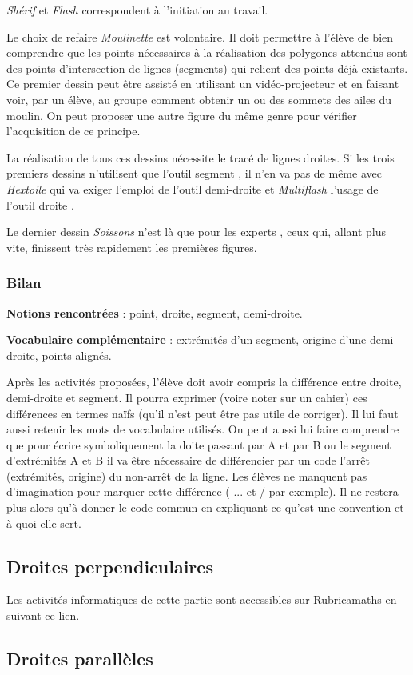 \textit{Shérif} et \textit{Flash} correspondent à l’initiation au travail.

Le choix de refaire \textit{Moulinette} est volontaire. Il doit permettre à l’élève de bien comprendre que les points nécessaires à la réalisation des polygones attendus sont des points d’intersection de lignes (segments) qui relient des points déjà existants. Ce premier dessin peut être \og assisté \fg{} en utilisant un vidéo-projecteur et en faisant voir, par un élève, au groupe comment obtenir un ou des sommets des ailes du moulin. On peut proposer une autre figure du même genre pour vérifier l’acquisition de ce principe.

La réalisation de tous ces dessins nécessite le tracé de lignes droites. Si les trois premiers dessins n’utilisent que l’outil \og segment \fg{}, il n’en va pas de même avec \textit{Hextoile} qui va exiger l’emploi de l’outil \og demi-droite \fg{} et \textit{Multiflash} l’usage de l’outil \og droite \fg{}.

Le dernier dessin \textit{Soissons} n’est là que pour les \og experts \fg{}, ceux qui, allant plus vite, finissent très rapidement les premières figures.

\subsubsection{Bilan}

\textbf{Notions rencontrées} : point, droite, segment, demi-droite.

\textbf{Vocabulaire complémentaire} : extrémités d’un segment, origine d’une demi-droite, points alignés.

Après les activités proposées, l’élève doit avoir compris la différence entre droite, demi-droite et segment. Il pourra exprimer (voire noter sur un cahier) ces différences en termes naïfs (qu’il n’est peut être pas utile de corriger). Il lui faut aussi retenir les mots de vocabulaire utilisés. On peut aussi lui faire comprendre que pour écrire symboliquement \og la doite passant par A et par B\fg{} ou \og le segment d’extrémités A et B\fg{} il va être nécessaire de différencier par un code l’arrêt (extrémités, origine) du non-arrêt de la ligne. Les élèves ne manquent pas d’imagination pour marquer cette différence ( ... et / par exemple). Il ne restera plus alors qu’à donner le code commun en expliquant ce qu’est une convention et à quoi elle sert.

\subsection{Droites perpendiculaires}

Les activités informatiques de cette partie sont accessibles sur Rubricamaths en suivant ce lien.

\subsection{Droites parallèles}
